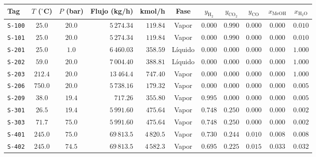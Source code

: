 \documentclass[10pt,landscape]{article}
\begin{document}
\scriptsize
\renewcommand{\arraystretch}{1.14}
\begin{tabularx}{\textwidth}{l c c r r c c c c c c}
  \toprule
  \rowcolor{tableheader}
  \textbf{\color{white}Tag} & \textbf{\color{white}$T$ ($^\circ$C)} & \textbf{\color{white}$P$ (bar)} & \textbf{\color{white}Flujo (kg/h)} & \textbf{\color{white}kmol/h} & \textbf{\color{white}Fase} & \textbf{\color{white}$y_{\text{H}_2}$} & \textbf{\color{white}$y_{\text{CO}_2}$} & \textbf{\color{white}$y_{\text{CO}}$} & \textbf{\color{white}$x_{\text{MeOH}}$} & \textbf{\color{white}$x_{\text{H}_2\text{O}}$} \\
  \midrule
  \rowcolor{roweven}
  \texttt{S-100} & $25.0$ & $20.0$ & $5\,274.34$ & $119.84$ & Vapor & $0.000$ & $0.990$ & $0.000$ & $0.000$ & $0.010$ \\
  \rowcolor{rowodd}
  \texttt{S-101} & $25.0$ & $20.0$ & $5\,274.34$ & $119.84$ & Vapor & $0.000$ & $0.990$ & $0.000$ & $0.000$ & $0.010$ \\
  \rowcolor{roweven}
  \texttt{S-201} & $25.0$ & $1.0$ & $6\,460.03$ & $358.59$ & Líquido & $0.000$ & $0.000$ & $0.000$ & $0.000$ & $1.000$ \\
  \rowcolor{rowodd}
  \texttt{S-202} & $59.0$ & $20.0$ & $7\,004.40$ & $388.81$ & Líquido & $0.000$ & $0.000$ & $0.000$ & $0.000$ & $1.000$ \\
  \rowcolor{roweven}
  \texttt{S-203} & $212.4$ & $20.0$ & $13\,464.4$ & $747.40$ & Vapor & $0.000$ & $0.000$ & $0.000$ & $0.000$ & $1.000$ \\
  \rowcolor{rowodd}
  \texttt{S-206} & $750.0$ & $20.0$ & $5\,738.16$ & $179.32$ & Vapor & $0.000$ & $0.000$ & $0.000$ & $0.000$ & $0.005$ \\
  \rowcolor{roweven}
  \texttt{S-209} & $38.0$ & $19.4$ & $717.26$ & $355.80$ & Vapor & $0.995$ & $0.000$ & $0.000$ & $0.000$ & $0.005$ \\
  \rowcolor{rowodd}
  \texttt{S-301} & $26.5$ & $19.4$ & $5\,991.60$ & $475.64$ & Vapor & $0.748$ & $0.250$ & $0.000$ & $0.000$ & $0.002$ \\
  \rowcolor{roweven}
  \texttt{S-303} & $71.7$ & $75.0$ & $5\,991.60$ & $475.64$ & Vapor & $0.748$ & $0.250$ & $0.000$ & $0.000$ & $0.002$ \\
  \rowcolor{rowodd}
  \texttt{S-401} & $245.0$ & $75.0$ & $69\,813.5$ & $4\,820.5$ & Vapor & $0.730$ & $0.244$ & $0.010$ & $0.008$ & $0.008$ \\
  \rowcolor{roweven}
  \texttt{S-402} & $245.0$ & $74.5$ & $69\,813.5$ & $4\,582.3$ & Vapor & $0.695$ & $0.225$ & $0.015$ & $0.033$ & $0.032$ \\

\end{tabularx}
\end{document}
